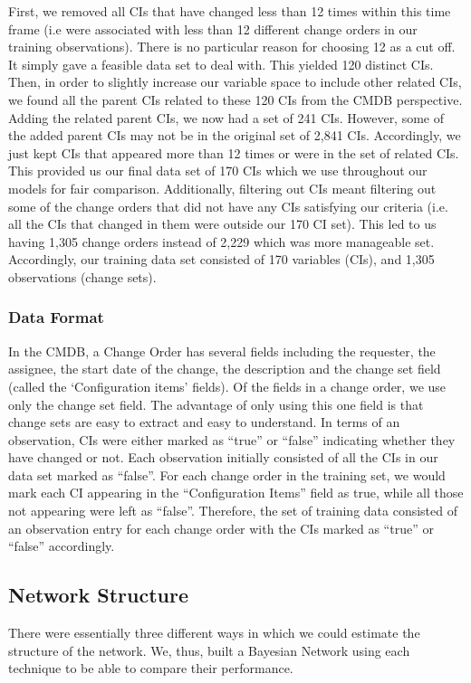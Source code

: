 \documentclass[10pt,twocolumn,letterpaper]{article}
\begin{document}
First, we removed all CIs that have changed less than 12 times within this time frame  (i.e were associated with less than 12 different change orders in our
training observations). There is no particular reason for choosing 12 as a cut off. It simply gave a feasible data set to deal with. This yielded 120 distinct
CIs. Then, in order to slightly increase our variable space to include other related CIs, we found all the parent CIs related to these 120 CIs from the CMDB
perspective. Adding the related parent CIs, we now had a set of 241 CIs. However, some of the added parent CIs may not be in the original set of 2,841 CIs.
Accordingly, we just kept CIs that appeared more than 12 times or were in the set of related CIs. This provided us our final data set of 170 CIs which we use
throughout our models for fair comparison. Additionally, filtering out CIs meant filtering out some of the change orders that did not have any CIs satisfying
our criteria (i.e. all the CIs that changed in them were outside our 170 CI set). This led to us having 1,305 change orders instead of 2,229 which was more
manageable set. Accordingly, our training data set consisted of 170 variables (CIs), and 1,305 observations (change sets).

\subsubsection*{Data Format}
\label{sec:format}

In the CMDB, a Change Order has several fields including the requester, the assignee, the start date of the change, the description and the change set field
(called the `Configuration items' fields). Of the fields in a change order, we use only the change set field. The advantage of only using this one field is that
change sets are easy to extract and easy to understand. In terms of an observation, CIs were either marked as ``true'' or ``false'' indicating whether they
have changed or not. Each observation initially consisted of all the CIs in our data set marked as ``false''. For each change order in the training set, we
would
mark each CI appearing in the ``Configuration Items'' field as true, while all those not appearing were left as ``false''. Therefore, the set of training
data consisted of an observation entry for each change order with the CIs marked as ``true'' or ``false'' accordingly.

\subsection{Network Structure}
\label{sec:structure}
There were essentially three different ways in which we could estimate the structure of the network. We, thus, built a Bayesian Network using each technique to
be able to compare their performance.
\end{document}
